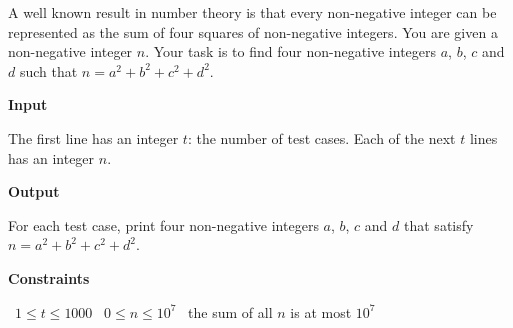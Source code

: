 A well known result in number theory is that every non-negative integer can be represented as the sum of four squares of non-negative integers.
You are given a non-negative integer $n$. Your task is to find four non-negative integers $a$, $b$, $c$ and $d$ such that $n = a^2 + b^2 + c^2 + d^2$.

\vspace{0.3cm}\noindent\textbf{Input}

The first line has an integer $t$: the number of test cases.
Each of the next $t$ lines has an integer $n$.

\vspace{0.3cm}\noindent\textbf{Output}

For each test case, print four non-negative integers $a$, $b$, $c$ and $d$ that satisfy $n = a^2 + b^2 + c^2 + d^2$.

\vspace{0.3cm}\noindent\textbf{Constraints}

\textbullet\ $1 \le t \le 1000$
\textbullet\ $0 \le n \le 10^7$
\textbullet\ the sum of all $n$ is at most $10^7$